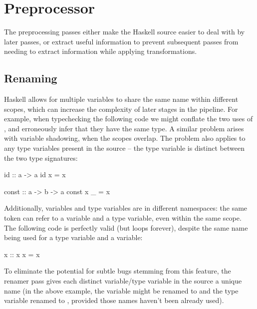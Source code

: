 \documentclass[dissertation.tex]{subfiles}
\begin{document}
\section{Preprocessor}
{

    The preprocessing passes either make the Haskell source easier to deal with by later passes, or extract useful
    information to prevent subsequent passes from needing to extract information while applying transformations.

    \subsection{Renaming}
    {

        Haskell allows for multiple variables to share the same name within different scopes, which can increase the
        complexity of later stages in the pipeline. For example, when typechecking the following code we might conflate
        the two uses of , and erroneously infer that they have the same type. A similar problem arises with
        variable shadowing, when the scopes overlap. The problem also applies to any type variables present in the
        source -- the type variable  is distinct between the two type signatures:

        \begin{haskellfigure}
        id :: a -> a
        id x = x

        const :: a -> b -> a
        const x _ = x
        \end{haskellfigure}

        Additionally, variables and type variables are in different namespaces: the same token can refer to a variable
        and a type variable, even within the same scope. The following code is perfectly valid (but loops forever),
        despite the same name being used for a type variable and a variable:

        \begin{haskellfigure}
        x :: x
        x = x
        \end{haskellfigure}

        To eliminate the potential for subtle bugs stemming from this feature, the renamer pass gives each distinct
        variable/type variable in the source a unique name (in the above example, the variable  might be
        renamed to  and the type variable renamed to , provided those names haven't been
        already used).
        
}}
\end{document}
